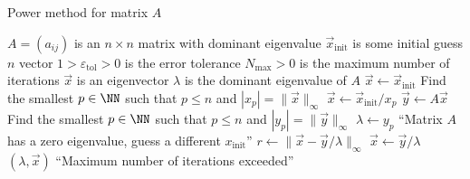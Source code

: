 \begin{algorithm}\label{alg:eigenvalues:power-method}
  \caption{Power method for matrix $A$}
  \begin{algorithmic}[1]
    \Require $A=(a_{ij})$ is an $n\times n$ matrix with dominant eigenvalue
    \Require $\vec{x}_{\text{init}}$ is some initial guess $n$ vector
    \Require $1>\varepsilon_{\text{tol}}>0$ is the error tolerance
    \Require $N_{\text{max}}>0$ is the maximum number of iterations
    \Ensure $\vec{x}$ is an eigenvector
    \Ensure $\lambda$ is the dominant eigenvalue of $A$
    \State $\vec{x}\gets\vec{x}_{\text{init}}$ 
    \State Find the smallest $p\in\NN$ such that $p\leq n$ and $|x_{p}|=\|\vec{x}\|_{\infty}$
    \State $\vec{x}\gets \vec{x}_{\text{init}}/x_{p}$
      \State $\vec{y}\gets A\vec{x}$
      \State Find the smallest $p\in\NN$ such that $p\leq n$ and $|y_{p}|=\|\vec{y}\|_{\infty}$
      \State $\lambda\gets y_{p}$
        \State\Fail ``Matrix $A$ has a zero eigenvalue, guess a different $x_{\text{init}}$''
      \EndIf
      \State $r\gets \|\vec{x}-\vec{y}/\lambda\|_{\infty}$
      \State $\vec{x}\gets\vec{y}/\lambda$
        \State\Return $(\lambda,\vec{x})$
      \EndIf
    \EndFor
    \State\Fail ``Maximum number of iterations exceeded''
  \EndFunction
\end{algorithmic}
\end{algorithm}
